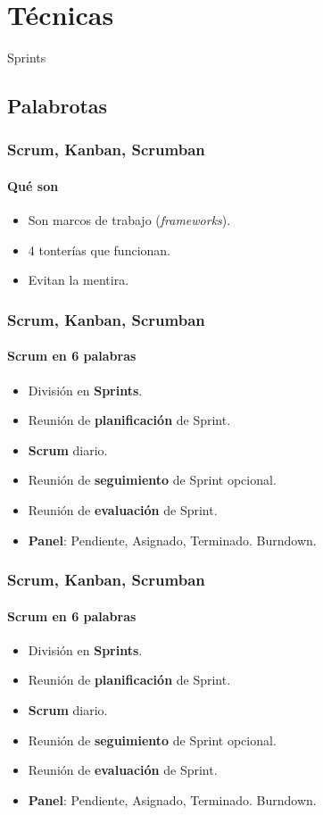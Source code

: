 \section{Técnicas}
Sprints
\subsection{Palabrotas}

\begin{frame}
  \frametitle{Scrum, Kanban, Scrumban}
  \framesubtitle{Qué son}

  \begin{itemize}
  \item Son marcos de trabajo (\textit{frameworks}).
  \item 4 tonterías que funcionan.
  \item Evitan la mentira.
  \end{itemize}
\end{frame}

\begin{frame}
  \frametitle{Scrum, Kanban, Scrumban}
  \framesubtitle{Scrum en 6 palabras}

  \begin{itemize}
  \item División en \textbf{Sprints}.
  \item Reunión de \textbf{planificación} de Sprint.
  \item \textbf{Scrum} diario.
  \item Reunión de \textbf{seguimiento} de Sprint opcional.
  \item Reunión de \textbf{evaluación} de Sprint.
  \item \textbf{Panel}: Pendiente, Asignado, Terminado. Burndown.
  \end{itemize}
\end{frame}

\begin{frame}
  \frametitle{Scrum, Kanban, Scrumban}
  \framesubtitle{Scrum en 6 palabras}

  \begin{itemize}
  \item División en \textbf{Sprints}.
  \item Reunión de \textbf{planificación} de Sprint.
  \item \textbf{Scrum} diario.
  \item Reunión de \textbf{seguimiento} de Sprint opcional.
  \item Reunión de \textbf{evaluación} de Sprint.
  \item \textbf{Panel}: Pendiente, Asignado, Terminado. Burndown.
  \end{itemize}
\end{frame}


